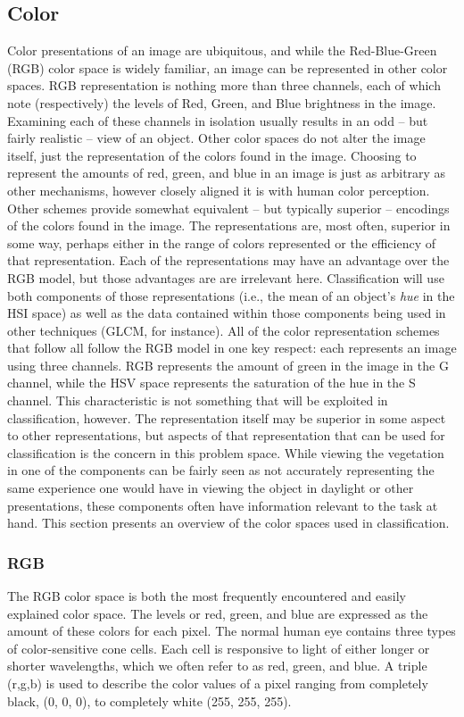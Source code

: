 \documentclass[letterpaper]{report}
\begin{document}
\subsection{Color}
Color presentations of an image are ubiquitous, and while the Red-Blue-Green (RGB) color space is widely familiar, an image can be represented in other color spaces. RGB representation is nothing more than three channels, each of which note (respectively) the levels of Red, Green, and Blue brightness in the image.  Examining each of these channels in isolation usually results in an odd -- but fairly realistic -- view of an object. Other color spaces do not alter the image itself, just the representation of the colors found in the image.  Choosing to represent the amounts of red, green, and blue in an image is just as arbitrary as other mechanisms, however closely aligned it is with human color perception. Other schemes provide somewhat equivalent -- but typically superior -- encodings of the colors found in the image. The representations are, most often, superior in some way, perhaps either in the range of colors represented or the efficiency of that representation. Each of the representations may have an advantage over the RGB model, but those advantages are are irrelevant  here. Classification will use both components of those representations (i.e., the mean of an object's \textit{hue} in the HSI space) as well as the data contained within those components being used in other techniques (GLCM, for instance). All of the color representation schemes that follow all follow the RGB model in one key respect: each represents an image using three channels. RGB represents the amount of green in the image in the G channel, while the HSV space represents the saturation of the hue in the S channel. This characteristic is not something that will be exploited in classification, however. The representation itself may be superior in some aspect to other representations, but aspects of that representation that can be used for classification is the concern in this problem space. While viewing the vegetation in one of the components can be fairly seen as not accurately representing the same experience one would have in viewing the object in daylight or other presentations, these components often have information relevant to the task at hand. This section presents an overview of the color spaces used in classification.

\subsubsection{RGB}
The RGB color space is both the most frequently encountered and easily explained color space. The levels or red, green, and blue are expressed as the amount of these colors for each pixel. The normal human eye contains three types of color-sensitive cone cells. Each cell is responsive to light of either longer or shorter wavelengths, which we often refer to as red, green, and blue. A triple (r,g,b) is used to describe the color values of a pixel ranging from completely black, (0, 0, 0), to completely white (255, 255, 255).
\end{document}
